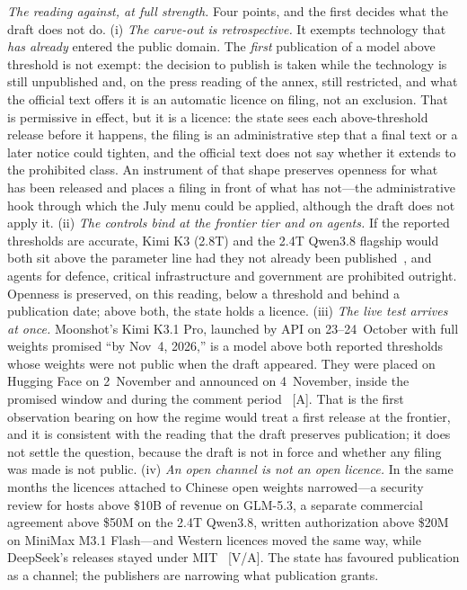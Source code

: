 \emph{The reading against, at full strength.} Four points, and the first decides what the draft does not do. (i) \emph{The carve-out is retrospective.} It exempts technology that \emph{has already} entered the public domain. The \emph{first} publication of a model above threshold is not exempt: the decision to publish is taken while the technology is still unpublished and, on the press reading of the annex, still restricted, and what the official text offers it is an automatic licence on filing, not an exclusion. That is permissive in effect, but it is a licence: the state sees each above-threshold release before it happens, the filing is an administrative step that a final text or a later notice could tighten, and the official text does not say whether it extends to the prohibited class. An instrument of that shape preserves openness for what has been released and places a filing in front of what has not---the administrative hook through which the July menu could be applied, although the draft does not apply it. (ii) \emph{The controls bind at the frontier tier and on agents.} If the reported thresholds are accurate, Kimi K3 (2.8T) and the 2.4T Qwen3.8 flagship would both sit above the parameter line had they not already been published~\cite{kimi-k3,qwen38-weights}, and agents for defence, critical infrastructure and government are prohibited outright. Openness is preserved, on this reading, below a threshold and behind a publication date; above both, the state holds a licence. (iii) \emph{The live test arrives at once.} Moonshot's Kimi K3.1 Pro, launched by API on 23--24~October with full weights promised ``by Nov~4, 2026,'' is a model above both reported thresholds whose weights were not public when the draft appeared. They were placed on Hugging Face on 2~November and announced on 4~November, inside the promised window and during the comment period~\cite{mdl-kimi-k31,lit-k31-weights} [A]. That is the first observation bearing on how the regime would treat a first release at the frontier, and it is consistent with the reading that the draft preserves publication; it does not settle the question, because the draft is not in force and whether any filing was made is not public. (iv) \emph{An open channel is not an open licence.} In the same months the licences attached to Chinese open weights narrowed---a security review for hosts above \$10B of revenue on GLM-5.3, a separate commercial agreement above \$50M on the 2.4T Qwen3.8, written authorization above \$20M on MiniMax M3.1 Flash---and Western licences moved the same way, while DeepSeek's releases stayed under MIT~\cite{glm53,qwen38-weights,gov-licence-narrowing} [V/A]. The state has favoured publication as a channel; the publishers are narrowing what publication grants.


